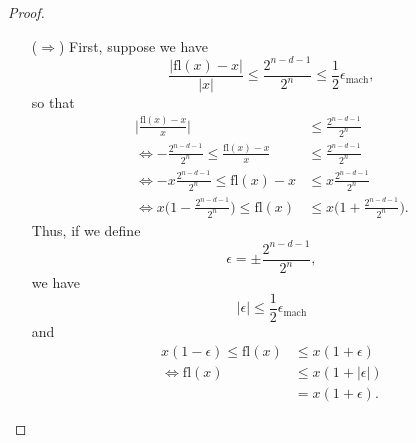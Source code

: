 
\begin{proof}
    \begin{itemize}
        \item[($\Rightarrow$)]
            First, suppose we have
            \[
                \frac{\lvert \text{fl}(x) - x \rvert}{\lvert x \rvert}
                \leq \frac{2^{n-d-1}}{2^n} \leq \frac{1}{2}\epsilon_{\text{mach}},
            \]
            so that
            \begin{equation*}
                \begin{split}
                    \Biggl\lvert \frac{\text{fl}(x) - x}{x} \Biggr\rvert 
                    &\leq \frac{2^{n-d-1}}{2^n} \\
                    \Leftrightarrow -\frac{2^{n-d-1}}{2^n} \leq 
                    \frac{\text{fl}(x) - x}{x} &\leq \frac{2^{n-d-1}}{2^n} \\
                    \Leftrightarrow -x\frac{2^{n-d-1}}{2^n} \leq 
                    \text{fl}(x) - x &\leq x\frac{2^{n-d-1}}{2^n} \\
                    \Leftrightarrow x \biggl(1 - \frac{2^{n-d-1}}{2^n}\biggr) 
                    \leq \text{fl}(x) &\leq x 
                    \biggl(1 + \frac{2^{n-d-1}}{2^n} \biggr).
                \end{split}
            \end{equation*}
            Thus, if we define
            \[
                \epsilon = \pm \frac{2^{n-d-1}}{2^n}, 
            \]
            we have
            \[
                \lvert \epsilon \rvert \leq \frac{1}{2}\epsilon_{\text{mach}}
            \]
            and
            \begin{equation*}
                \begin{split}
                    x (1 - \epsilon) \leq \text{fl}(x) &\leq x (1 + \epsilon) \\
                    \Leftrightarrow \text{fl}(x) &\leq x (1 + \lvert\epsilon\rvert) \\
                                                 &= x (1 + \epsilon).
                \end{split} 
            \end{equation*}
    \end{itemize}
\end{proof}
